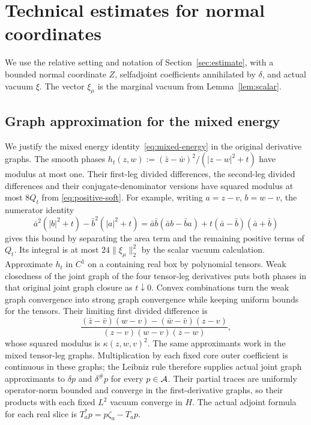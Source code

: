 \section{Technical estimates for normal coordinates}\label{sec:analytic-details}
We use the relative setting and notation of Section~\ref{sec:estimate}, with a bounded normal coordinate $Z$, selfadjoint coefficients annihilated by $\delta$, and actual vacuum $\xi$.
The vector $\xi_\mu$ is the marginal vacuum from Lemma~\ref{lem:scalar}.

\subsection{Graph approximation for the mixed energy}\label{subsec:mixed-energy-graphs}
We justify the mixed energy identity~\eqref{eq:mixed-energy} in the original derivative graphs.
The smooth phases $h_t(z,w):=(\bar z-\bar w)^2/(|z-w|^2+t)$ have modulus at most one.
Their first-leg divided differences, the second-leg divided differences and their conjugate-denominator versions have squared modulus at most $8Q_t$ from \eqref{eq:positive-soft}.
For example, writing $a=z-v$, $b=w-v$, the numerator identity
\[
 \bar a^2(|b|^2+t)-\bar b^2(|a|^2+t)
 =\bar a\bar b(\bar a b-\bar b a)+t(\bar a-\bar b)(\bar a+\bar b)
\]
gives this bound by separating the area term and the remaining positive terms of $Q_t$.
Its integral is at most $24\|\xi_\mu\|_2^2$ by the scalar vacuum calculation.
Approximate $h_t$ in $C^1$ on a containing real box by polynomial tensors.
Weak closedness of the joint graph of the four tensor-leg derivatives puts both phases in that original joint graph closure as $t\downarrow0$.
Convex combinations turn the weak graph convergence into strong graph convergence while keeping uniform bounds for the tensors.
Their limiting first divided difference is
\[
 \frac{(\bar z-\bar v)(w-v)-(\bar w-\bar v)(z-v)}
 {(z-v)(w-v)(z-w)},
\]
whose squared modulus is $\kappa(z,w,v)^2$.
The same approximants work in the mixed tensor-leg graphs.
Multiplication by each fixed core outer coefficient is continuous in these graphs; the Leibniz rule therefore supplies actual joint graph approximants to $\delta p$ and $\delta^\#p$ for every $p\in\mathcal A$.
Their partial traces are uniformly operator-norm bounded and converge in the first-derivative graphs, so their products with each fixed $L^2$ vacuum converge in $H$.
The actual adjoint formula for each real slice is $T_a^*p=p\zeta_a-T_ap$.

